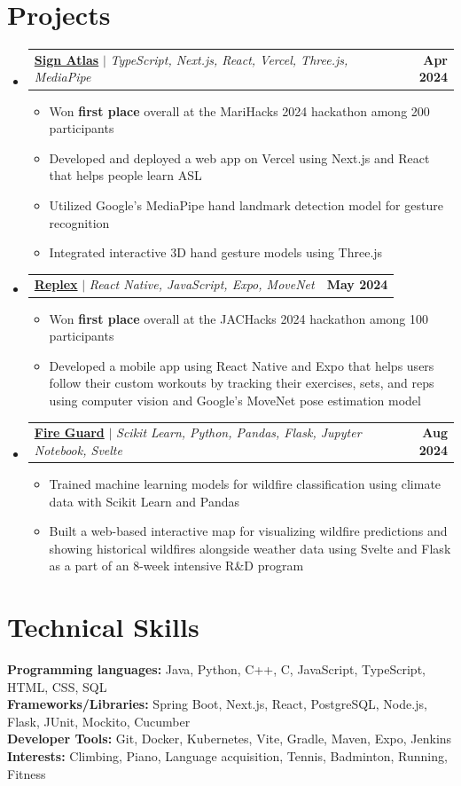 \documentclass[letterpaper,11pt]{article}
\makeatletter
\newcommand{\resumeItem}[1]{
  \item\small{
    {#1 \vspace{-2pt}}
  }
}
\newcommand{\resumeProjectHeading}[4]{
  \item
  \begin{tabular*}{\textwidth}{l@{\extracolsep{\fill}}r}
    \small{\href{#3}{\textbf{#1}\hspace{0.3em}{\faLink}} $|$ \emph{#2}} & \textbf{\small #4} \\
  \end{tabular*}\vspace{-7pt}
}
\newcommand{\resumeSubHeadingListStart}{\begin{itemize}[leftmargin=0in, label={}]}
\newcommand{\resumeSubHeadingListEnd}{\end{itemize}}
\newcommand{\resumeItemListStart}{\begin{itemize}}
\newcommand{\resumeItemListEnd}{\end{itemize}\vspace{-5pt}}
\makeatother
\begin{document}
\section{Projects}
    \resumeSubHeadingListStart
      \resumeProjectHeading
          {Sign Atlas}
          {TypeScript, Next.js, React, Vercel, Three.js, MediaPipe}
          {https://devpost.com/software/sign-atlas}
          {Apr 2024}
          \resumeItemListStart
            \resumeItem{Won \textbf{first place} overall at the MariHacks 2024 hackathon among 200 participants}
            \resumeItem{Developed and deployed a web app on Vercel using Next.js and React that helps people learn ASL}
            \resumeItem{Utilized Google’s MediaPipe hand landmark detection model for gesture recognition}
            \resumeItem{Integrated interactive 3D hand gesture models using Three.js}
          \resumeItemListEnd
      \resumeProjectHeading
          {Replex}
          {React Native, JavaScript, Expo, MoveNet}
          {https://devpost.com/software/replex}
          {May 2024}
          \resumeItemListStart
            \resumeItem{Won \textbf{first place} overall at the JACHacks 2024 hackathon among 100 participants}
            \resumeItem{Developed a mobile app using React Native and Expo that helps users follow their custom workouts by tracking their exercises, sets, and reps using computer vision and Google’s MoveNet pose estimation model}
          \resumeItemListEnd
      \resumeProjectHeading
          {Fire Guard}
          {Scikit Learn, Python, Pandas, Flask, Jupyter Notebook, Svelte}
          {https://github.com/tran-ethan/fire-guard}
          {Aug 2024}
          \resumeItemListStart
            \resumeItem{Trained machine learning models for wildfire classification using climate data with Scikit Learn and Pandas}
            \resumeItem{Built a web-based interactive map for visualizing wildfire predictions and showing historical wildfires alongside weather data using Svelte and Flask as a part of an 8-week intensive R\&D program}
          \resumeItemListEnd
    \resumeSubHeadingListEnd

%
\section{Technical Skills}
 \begin{itemize}[leftmargin=0in, label={}]
    \small{\item{
     \textbf{Programming languages:}{ Java, Python, C++, C, JavaScript, TypeScript, HTML, CSS, SQL} \\
     \textbf{Frameworks/Libraries:}{ Spring Boot, Next.js, React, PostgreSQL, Node.js, Flask, JUnit, Mockito, Cucumber} \\
     \textbf{Developer Tools:}{ Git, Docker, Kubernetes, Vite, Gradle, Maven, Expo, Jenkins} \\
     \textbf{Interests:}{ Climbing, Piano, Language acquisition, Tennis, Badminton, Running, Fitness } \\
    }}
 \end{itemize}

\end{document}
